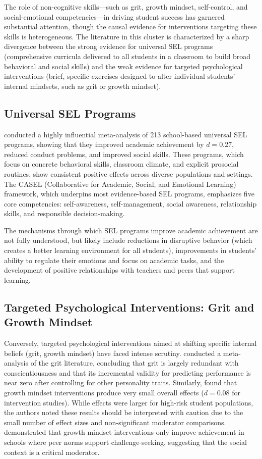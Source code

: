 \documentclass[12pt,letterpaper]{article}
\begin{document}
The role of non-cognitive skills---such as grit, growth mindset, self-control, and social-emotional competencies---in driving student success has garnered substantial attention, though the causal evidence for interventions targeting these skills is heterogeneous. The literature in this cluster is characterized by a sharp divergence between the strong evidence for universal SEL programs (comprehensive curricula delivered to all students in a classroom to build broad behavioral and social skills) and the weak evidence for targeted psychological interventions (brief, specific exercises designed to alter individual students' internal mindsets, such as grit or growth mindset).

\subsection{Universal SEL Programs}

\citet{durlak2011} conducted a highly influential meta-analysis of 213 school-based universal SEL programs, showing that they improved academic achievement by $d = 0.27$, reduced conduct problems, and improved social skills. These programs, which focus on concrete behavioral skills, classroom climate, and explicit prosocial routines, show consistent positive effects across diverse populations and settings. The CASEL (Collaborative for Academic, Social, and Emotional Learning) framework, which underpins most evidence-based SEL programs, emphasizes five core competencies: self-awareness, self-management, social awareness, relationship skills, and responsible decision-making.

The mechanisms through which SEL programs improve academic achievement are not fully understood, but likely include reductions in disruptive behavior (which creates a better learning environment for all students), improvements in students' ability to regulate their emotions and focus on academic tasks, and the development of positive relationships with teachers and peers that support learning.

\subsection{Targeted Psychological Interventions: Grit and Growth Mindset}

Conversely, targeted psychological interventions aimed at shifting specific internal beliefs (grit, growth mindset) have faced intense scrutiny. \citet{cred2017} conducted a meta-analysis of the grit literature, concluding that grit is largely redundant with conscientiousness and that its incremental validity for predicting performance is near zero after controlling for other personality traits. Similarly, \citet{sisk2018} found that growth mindset interventions produce very small overall effects ($d = 0.08$ for intervention studies). While effects were larger for high-risk student populations, the authors noted these results should be interpreted with caution due to the small number of effect sizes and non-significant moderator comparisons. \citet{yeager2019} demonstrated that growth mindset interventions only improve achievement in schools where peer norms support challenge-seeking, suggesting that the social context is a critical moderator.
\end{document}
